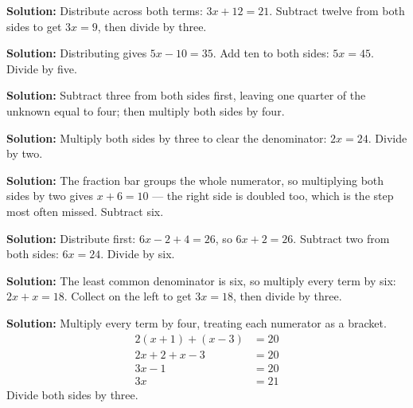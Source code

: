 \documentclass[12pt]{article}
\begin{document}




\textbf{Solution:} \quad Distribute across both terms: $3x + 12 = 21$. Subtract twelve
from both sides to get $3x = 9$, then divide by three. 


\textbf{Solution:} \quad Distributing gives $5x - 10 = 35$. Add ten to both sides:
$5x = 45$. Divide by five. 


\textbf{Solution:} \quad Subtract three from both sides first, leaving one quarter of the
unknown equal to four; then multiply both sides by four. 


\textbf{Solution:} \quad Multiply both sides by three to clear the denominator:
$2x = 24$. Divide by two. 


\textbf{Solution:} \quad The fraction bar groups the whole numerator, so multiplying both
sides by two gives $x + 6 = 10$ --- the right side is doubled too, which is the step most
often missed. Subtract six. 


\textbf{Solution:} \quad Distribute first: $6x - 2 + 4 = 26$, so $6x + 2 = 26$. Subtract
two from both sides: $6x = 24$. Divide by six. 


\textbf{Solution:} \quad The least common denominator is six, so multiply every term by
six: $2x + x = 18$. Collect on the left to get $3x = 18$, then divide by three. 


\textbf{Solution:} \quad Multiply every term by four, treating each numerator as a bracket.
\begin{align*}
  2(x + 1) + (x - 3) &= 20 \\
  2x + 2 + x - 3 &= 20 \\
  3x - 1 &= 20 \\
  3x &= 21
\end{align*}
Divide both sides by three. 
\end{document}
